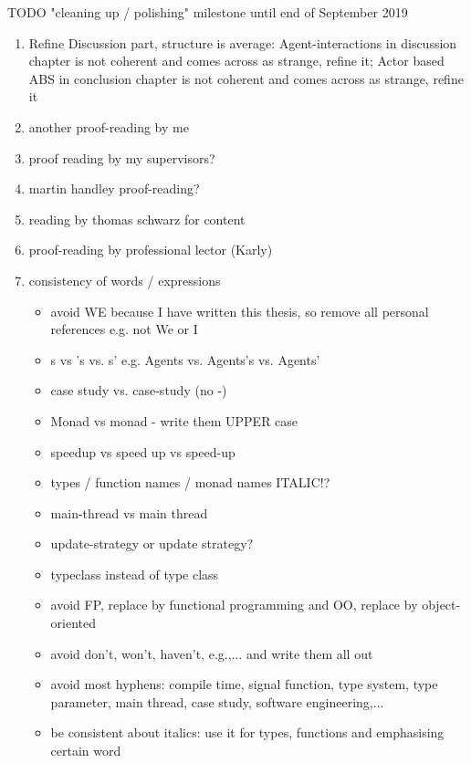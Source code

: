 \documentclass[oneside]{book}
\begin{document}
TODO "cleaning up / polishing" milestone until end of September 2019
\begin{enumerate}
	\item Refine Discussion part, structure is average: Agent-interactions in discussion chapter is not coherent and comes across as strange, refine it; Actor based ABS in conclusion chapter is not coherent and comes across as strange, refine it

	\item another proof-reading by me	

	\item proof reading by my supervisors?

	\item martin handley proof-reading?
	
	\item reading by thomas schwarz for content
		
	\item proof-reading by professional lector (Karly)

	\item consistency of words / expressions
		\begin{itemize}
			\item avoid WE because I have written this thesis, so remove all personal references e.g. not We or I
			\item s vs 's vs. s' e.g. Agents vs. Agents's vs. Agents'
			\item case study vs. case-study (no -)
			\item Monad vs monad - write them UPPER case
			\item speedup vs speed up vs speed-up
			\item types / function names / monad names ITALIC!?
			\item main-thread vs main thread
			\item update-strategy or update strategy?
			\item typeclass instead of type class
			\item avoid FP, replace by functional programming and OO, replace by object-oriented
			\item avoid don't, won't, haven't, e.g.,... and write them all out
			\item avoid most hyphens: compile time, signal function, type system, type parameter, main thread, case study, software engineering,...
			\item be consistent about italics: use it for types, functions and emphasising certain word
		\end{itemize}
		

\end{enumerate}
\end{document}
